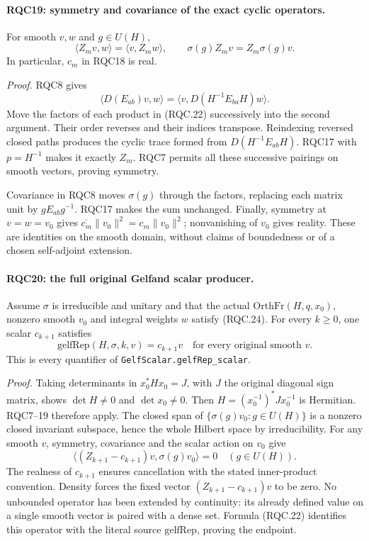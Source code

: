 \paragraph{RQC19: symmetry and covariance of the exact cyclic operators.}
\label{claim:RQC19}
For smooth \(v,w\) and \(g\in U(H)\),
\[
 \langle Z_mv,w\rangle=\langle v,Z_mw\rangle,\qquad
 \sigma(g)Z_mv=Z_m\sigma(g)v.
 \tag{RQC.26}
\]
In particular, \(c_m\) in RQC18 is real.

\emph{Proof.}
RQC8 gives
\[
 \langle D(E_{ab})v,w\rangle
  =\langle v,D(H^{-1}E_{ba}H)w\rangle.
 \tag{RQC.27}
\]
Move the factors of each product in (RQC.22) successively into
the second argument.  Their order reverses and their indices
transpose.  Reindexing reversed closed paths produces the cyclic
trace formed from \(D(H^{-1}E_{ab}H)\).
RQC17 with \(p=H^{-1}\) makes it exactly \(Z_m\).
RQC7 permits all these successive pairings on smooth vectors,
proving symmetry.

Covariance in RQC8 moves \(\sigma(g)\) through the factors,
replacing each matrix unit by \(gE_{ab}g^{-1}\).
RQC17 makes the sum unchanged.
Finally, symmetry at \(v=w=v_0\) gives
\(\overline{c_m}\|v_0\|^2=c_m\|v_0\|^2\);
nonvanishing of \(v_0\) gives reality.
These are identities on the smooth domain, without claims of
boundedness or of a chosen self-adjoint extension.

\paragraph{RQC20: the full original Gelfand scalar producer.}
\label{claim:RQC20}
Assume \(\sigma\) is irreducible and unitary and that the actual
\(\mathrm{OrthFr}(H,q,x_0)\), nonzero smooth \(v_0\) and integral
weights \(w\) satisfy (RQC.24).
For every \(k\ge0\), one scalar \(c_{k+1}\) satisfies
\[
 \mathrm{gelfRep}(H,\sigma,k,v)=c_{k+1}v
 \quad\text{for every original smooth }v.
 \tag{RQC.28}
\]
This is every quantifier of \texttt{GelfScalar.gelfRep\_scalar}.

\emph{Proof.}
Taking determinants in \(x_0^*Hx_0=J\), with \(J\) the original
diagonal sign matrix, shows \(\det H\ne0\) and \(\det x_0\ne0\).
Then \(H=(x_0^{-1})^*Jx_0^{-1}\) is Hermitian.
RQC7--19 therefore apply.
The closed span of \(\{\sigma(g)v_0:g\in U(H)\}\) is a nonzero
closed invariant subspace, hence the whole Hilbert space by
irreducibility.
For any smooth \(v\), symmetry, covariance and the scalar action
on \(v_0\) give
\[
 \langle(Z_{k+1}-c_{k+1})v,\sigma(g)v_0\rangle=0
 \quad(g\in U(H)).
 \tag{RQC.29}
\]
The realness of \(c_{k+1}\) ensures cancellation with the stated
inner-product convention.
Density forces the fixed vector
\((Z_{k+1}-c_{k+1})v\) to be zero.
No unbounded operator has been extended by continuity: its
already defined value on a single smooth vector is paired with a
dense set.  Formula (RQC.22) identifies this operator with the
literal source \(\mathrm{gelfRep}\), proving the endpoint.

